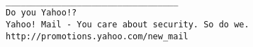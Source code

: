 \begin{small}
\begin{verbatim}
		
__________________________________
Do you Yahoo!?
Yahoo! Mail - You care about security. So do we.
http://promotions.yahoo.com/new_mail



\end{verbatim} 
\end{small}